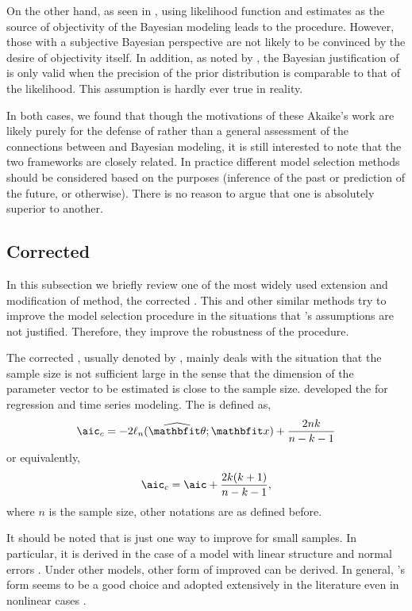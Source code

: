 On the other hand, as seen in \textcite{Akaike:1980gh}, using likelihood
function and \aic estimates as the source of objectivity of the Bayesian
modeling leads to the \bic procedure. However, those with a subjective
Bayesian perspective are not likely to be convinced by the desire of
objectivity itself. In addition, as noted by \textcite{Kass:1995vb}, the
Bayesian justification of \aic is only valid when the precision of the prior
distribution is comparable to that of the likelihood. This assumption is
hardly ever true in reality.

In both cases, we found that though the motivations of these Akaike's work are
likely purely for the defense of \aic rather than a general assessment of the
connections between \aic and Bayesian modeling, it is still interested to note
that the two frameworks are closely related. In practice different model
selection methods should be considered based on the purposes (inference of the
past or prediction of the future, or otherwise). There is no reason to argue
that one is absolutely superior to another.

\subsection{Corrected \protect\aic}
\label{sub:Corrected aic}

In this subsection we briefly review one of the most widely used extension and
modification of \aic method, the corrected \aic. This and other similar
methods try to improve the model selection procedure in the situations that
\textcite{Akaike:1973uc}'s assumptions are not justified. Therefore, they improve
the robustness of the \aic procedure.

The corrected \aic, usually denoted by \aicc, mainly deals with the situation
that the sample size is not sufficient large in the sense that the dimension
of the parameter vector to be estimated is close to the sample size.
\textcite{Hurvich:1989ev} developed the \aicc for regression and time series
modeling. The \aicc is defined as,
\begin{equation}
  \text{\aicc} = -2\ell_n(\hbth;\bfx) + \frac{2nk}{n-k-1}
\end{equation}
or equivalently,
\begin{equation}
  \text{\aicc} = \text{\aic} + \frac{2k(k+1)}{n-k-1},
\end{equation}
where $n$ is the sample size, other notations are as defined before.

It should be noted that \aicc is just one way to improve \aic for small
samples. In particular, it is derived in the case of a model with linear
structure and normal errors \parencite{Hurvich:1989ev, Burnham:2002wc}. Under
other models, other form of improved \aic can be derived. In general,
\textcite{Hurvich:1989ev}'s form seems to be a good choice and adopted
extensively in the literature even in nonlinear cases
\parencite[e.g.][]{Turkheimer:2003iy}.

